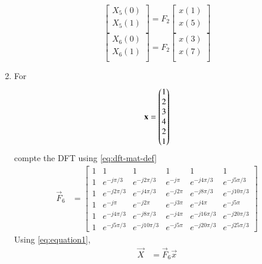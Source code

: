 \documentclass[journal,12pt,twocolumn]{IEEEtran}
\renewcommand\thesection{\arabic{section}}
\begin{document}
\begin{enumerate}[label=\arabic*.,ref=\thesection.\theenumi]
	\begin{equation}
		\begin{bmatrix}
			X_{5}(0) \\ 
			X_{5}(1)\\ 
		\end{bmatrix}
		= F_{2}
		\begin{bmatrix}
			x(1) \\ 
			x(5) \\ 
		\end{bmatrix}
	\end{equation}
	\begin{equation}
		\begin{bmatrix}
			X_{6}(0) \\ 
			X_{6}(1)\\ 
		\end{bmatrix}
		= F_{2}
		\begin{bmatrix}
			x(3) \\ 
			x(7) \\ 
		\end{bmatrix}
	\end{equation}
	\item For 
	\begin{align}
		\mathbf{x} = \begin{pmatrix}1\\2\\3\\4\\2\\1\end{pmatrix}
		\label{eq:equation1}
	\end{align}
	compte the DFT  
	using 
	\eqref{eq:dft-mat-def}
	\solution \begin{align}
		\vec{F}_6&=\begin{bmatrix}
			1&1&1&1&1&1\\1&e^{-j \pi/3 }&e^{-j 2 \pi/3 }&e^{-j \pi }&e^{-j 4 \pi/3 }&e^{-j 5 \pi/3 }\\1&e^{-j 2 \pi/3 }&e^{-j 4 \pi/3 }&e^{-j 2 \pi }&e^{-j 8\pi/3 }&e^{-j 10 \pi/3 }\\1&e^{-j \pi }&e^{-j 2 \pi }&e^{-j 3 \pi }&e^{-j 4 \pi }&e^{-j 5 \pi }\\1&e^{-j 4 \pi/3 }&e^{-j 8 \pi/3 }&e^{-j 4 \pi }&e^{-j 16 \pi/3 }&e^{-j 20 \pi/3 }\\1&e^{-j 5 \pi/3 }&e^{-j 10 \pi/3 }&e^{-j 5 \pi }&e^{-j 20 \pi/3 }&e^{-j 25 \pi/3 }
		\end{bmatrix}
	\end{align}
	Using \eqref{eq:equation1},
	\begin{align}
		\vec{X}&=\vec{F}_6\vec{x}
	\end{align}

\end{enumerate}
\end{document}
